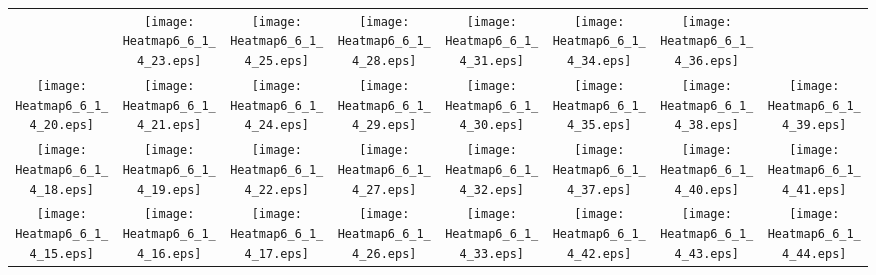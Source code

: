 \documentclass{standalone}
\begin{document}
\renewcommand{\arraystretch}{0}
\setlength{\tabcolsep}{0pt}
\begin{tabular}{ *8{c} }
 & \texttt{[image: Heatmap6\_6\_1\_4\_23.eps]} & \texttt{[image: Heatmap6\_6\_1\_4\_25.eps]} & \texttt{[image: Heatmap6\_6\_1\_4\_28.eps]} & \texttt{[image: Heatmap6\_6\_1\_4\_31.eps]} & \texttt{[image: Heatmap6\_6\_1\_4\_34.eps]} & \texttt{[image: Heatmap6\_6\_1\_4\_36.eps]} &  \\
\texttt{[image: Heatmap6\_6\_1\_4\_20.eps]} & \texttt{[image: Heatmap6\_6\_1\_4\_21.eps]} & \texttt{[image: Heatmap6\_6\_1\_4\_24.eps]} & \texttt{[image: Heatmap6\_6\_1\_4\_29.eps]} & \texttt{[image: Heatmap6\_6\_1\_4\_30.eps]} & \texttt{[image: Heatmap6\_6\_1\_4\_35.eps]} & \texttt{[image: Heatmap6\_6\_1\_4\_38.eps]} & \texttt{[image: Heatmap6\_6\_1\_4\_39.eps]} \\
\texttt{[image: Heatmap6\_6\_1\_4\_18.eps]} & \texttt{[image: Heatmap6\_6\_1\_4\_19.eps]} & \texttt{[image: Heatmap6\_6\_1\_4\_22.eps]} & \texttt{[image: Heatmap6\_6\_1\_4\_27.eps]} & \texttt{[image: Heatmap6\_6\_1\_4\_32.eps]} & \texttt{[image: Heatmap6\_6\_1\_4\_37.eps]} & \texttt{[image: Heatmap6\_6\_1\_4\_40.eps]} & \texttt{[image: Heatmap6\_6\_1\_4\_41.eps]} \\
\texttt{[image: Heatmap6\_6\_1\_4\_15.eps]} & \texttt{[image: Heatmap6\_6\_1\_4\_16.eps]} & \texttt{[image: Heatmap6\_6\_1\_4\_17.eps]} & \texttt{[image: Heatmap6\_6\_1\_4\_26.eps]} & \texttt{[image: Heatmap6\_6\_1\_4\_33.eps]} & \texttt{[image: Heatmap6\_6\_1\_4\_42.eps]} & \texttt{[image: Heatmap6\_6\_1\_4\_43.eps]} & \texttt{[image: Heatmap6\_6\_1\_4\_44.eps]} \\

\end{tabular}
\end{document}
